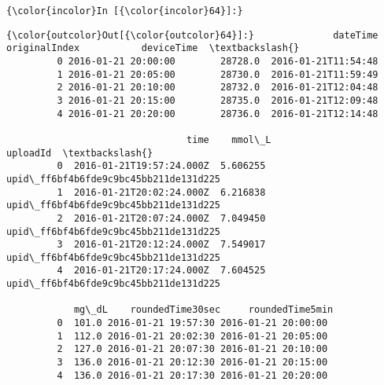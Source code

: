 \documentclass[11pt]{article}
\begin{document}
    \begin{Verbatim}[commandchars=\\\{\}]
{\color{incolor}In [{\color{incolor}64}]:} 
\end{Verbatim}


\begin{Verbatim}[commandchars=\\\{\}]
{\color{outcolor}Out[{\color{outcolor}64}]:}              dateTime  originalIndex           deviceTime  \textbackslash{}
         0 2016-01-21 20:00:00        28728.0  2016-01-21T11:54:48   
         1 2016-01-21 20:05:00        28730.0  2016-01-21T11:59:49   
         2 2016-01-21 20:10:00        28732.0  2016-01-21T12:04:48   
         3 2016-01-21 20:15:00        28735.0  2016-01-21T12:09:48   
         4 2016-01-21 20:20:00        28736.0  2016-01-21T12:14:48   
         
                                time    mmol\_L                               uploadId  \textbackslash{}
         0  2016-01-21T19:57:24.000Z  5.606255  upid\_ff6bf4b6fde9c9bc45bb211de131d225   
         1  2016-01-21T20:02:24.000Z  6.216838  upid\_ff6bf4b6fde9c9bc45bb211de131d225   
         2  2016-01-21T20:07:24.000Z  7.049450  upid\_ff6bf4b6fde9c9bc45bb211de131d225   
         3  2016-01-21T20:12:24.000Z  7.549017  upid\_ff6bf4b6fde9c9bc45bb211de131d225   
         4  2016-01-21T20:17:24.000Z  7.604525  upid\_ff6bf4b6fde9c9bc45bb211de131d225   
         
            mg\_dL    roundedTime30sec     roundedTime5min  
         0  101.0 2016-01-21 19:57:30 2016-01-21 20:00:00  
         1  112.0 2016-01-21 20:02:30 2016-01-21 20:05:00  
         2  127.0 2016-01-21 20:07:30 2016-01-21 20:10:00  
         3  136.0 2016-01-21 20:12:30 2016-01-21 20:15:00  
         4  136.0 2016-01-21 20:17:30 2016-01-21 20:20:00  
\end{Verbatim}
            

    
    
    
    
\end{document}
